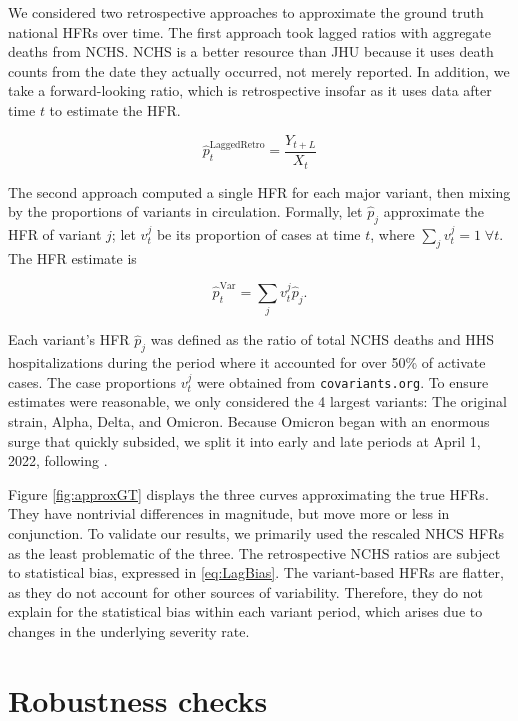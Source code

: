 \documentclass{article}
\renewcommand{\hat}{\widehat} %
\begin{document}
We considered two retrospective approaches to approximate the ground truth national HFRs over time. The first approach took lagged ratios with aggregate deaths from NCHS. NCHS is a better resource than JHU because it uses death counts from the date they actually occurred, not merely reported. In addition, we take a forward-looking ratio, which is retrospective insofar as it uses data after time $t$ to estimate the HFR.

\begin{equation}\label{eq:LaggedRetro}
    \hat{p}_t^{\text{LaggedRetro}} = \frac{Y_{t+L}}{X_t}
\end{equation}

The second approach computed a single HFR for each major variant, then mixing by the proportions of variants in circulation. Formally, let $\hat{p}_j$ approximate the HFR of variant $j$; let $v_t^j$ be its proportion of cases at time $t$, where $\sum_j v_t^j = 1 \; \forall t$. The HFR estimate is

$$\hat{p}_t^{\text{Var}} = \sum_j v_t^j \hat{p}_j.$$

Each variant's HFR $\hat p_j$ was defined as the ratio of total NCHS deaths and HHS hospitalizations during the period where it accounted for over 50\% of activate cases. The case proportions $v_t^j$ were obtained from \texttt{covariants.org}. To ensure estimates were reasonable, we only considered the 4 largest variants: The original strain, Alpha, Delta, and Omicron. Because Omicron began with an enormous surge that quickly subsided, we split it into early and late periods at April 1, 2022, following \citep{adjei2022mortality}.

Figure \ref{fig:approxGT} displays the three curves approximating the true HFRs. They have nontrivial differences in magnitude, but move more or less in conjunction. To validate our results, we primarily used the rescaled NHCS HFRs as the least problematic of the three. The retrospective NCHS ratios are subject to statistical bias, expressed in \eqref{eq:LagBias}. The variant-based HFRs are flatter, as they do not account for other sources of variability. Therefore, they do not explain for the statistical bias within each variant period, which arises due to changes in the underlying severity rate.  %

\section{Robustness checks}\label{apx:robustness}
\end{document}
